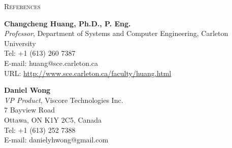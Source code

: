 \documentclass[letterpaper,11pt]{article}
\newcommand{\resheading}[1]{{\noindent\large \colorbox{mygrey}{
\begin{minipage}{1.0\textwidth}{\textsc{#1 \vphantom{p\^{E}}}}\end{minipage}}}}
\begin{document}
\resheading{References}%

\leftskip 0.2in %


%
%
\vspace{0.2in}%
\textbf{Changcheng Huang, Ph.D., P. Eng.}\\
\textit{Professor}, Department of Systems and Computer Engineering,
Carleton University\\
Tel: +1 (613) 260 7387\\
E-mail: huang@sce.carleton.ca\\
URL: \url{http://www.sce.carleton.ca/faculty/huang.html}




\vspace{0.2in}%
\textbf{Daniel Wong}\\
\textit{VP Product}, Viscore Technologies Inc.\\
7 Bayview Road\\
Ottawa, ON K1Y 2C5, Canada\\
Tel: +1 (613) 252 7388\\
E-mail: danielyhwong@gmail.com\\
\end{document}
